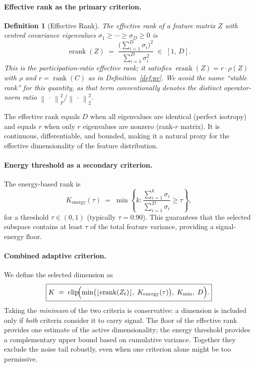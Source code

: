 \documentclass[11pt,a4paper]{article}
\newtheorem{definition}[theorem]{Definition}
\newcommand{\norm}[1]{\left\|#1\right\|}
\newcommand{\rank}{\operatorname{rank}}
\begin{document}
\paragraph{Effective rank as the primary criterion.}
\begin{definition}[Effective Rank]
\label{def:stable_rank}
The \emph{effective rank} of a feature matrix $Z$ with centred covariance
eigenvalues $\sigma_1 \ge \cdots \ge \sigma_D \ge 0$ is
\begin{equation}
    \operatorname{erank}(Z)
    \;=\; \frac{\bigl(\sum_{i=1}^D \sigma_i\bigr)^2}{\sum_{i=1}^D \sigma_i^2}
    \;\in\; [1,\, D].
\label{eq:stable_rank}
\end{equation}
This is the participation-ratio effective rank; it satisfies
$\operatorname{erank}(Z) = r\cdot\rho(Z)$ with $\rho$ and $r=\rank(C)$ as in
Definition~\ref{def:pr}.  We avoid the name ``stable rank'' for this quantity, as
that term conventionally denotes the distinct operator-norm ratio
$\norm{\,\cdot\,}_F^2/\norm{\,\cdot\,}_2^2$.
\end{definition}

The effective rank equals $D$ when all eigenvalues are identical (perfect
isotropy) and equals $r$ when only $r$ eigenvalues are nonzero (rank-$r$ matrix).
It is continuous, differentiable, and bounded, making it a natural proxy for
the effective dimensionality of the feature distribution.

\paragraph{Energy threshold as a secondary criterion.}
The energy-based rank is
\begin{equation}
    K_\text{energy}(\tau)
    \;=\; \min\!\left\{k : \frac{\sum_{i=1}^k \sigma_i}{\sum_{i=1}^D \sigma_i}
    \ge \tau\right\},
\label{eq:k_energy}
\end{equation}
for a threshold $\tau \in (0,1)$ (typically $\tau = 0.90$).  This guarantees
that the selected subspace contains at least $\tau$ of the total feature variance,
providing a signal-energy floor.

\paragraph{Combined adaptive criterion.}
We define the selected dimension as
\begin{equation}
\boxed{
    K \;=\; \operatorname{clip}\!\Bigl(
        \min\bigl(\lfloor\operatorname{erank}(Z_t)\rfloor,\; K_\text{energy}(\tau)\bigr),\;
        K_{\min},\; D
    \Bigr).
}
\label{eq:k_select}
\end{equation}
Taking the \emph{minimum} of the two criteria is conservative: a dimension is
included only if \emph{both} criteria consider it to carry signal.
The floor of the effective rank provides one estimate of the active
dimensionality; the energy threshold provides a complementary upper bound based
on cumulative variance.  Together they exclude the noise tail robustly, even when one
criterion alone might be too permissive.
\end{document}
